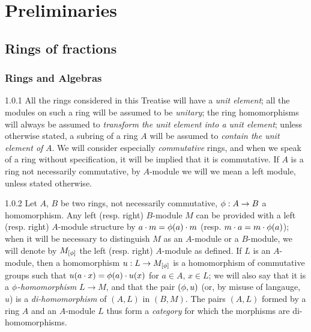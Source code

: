 \documentclass[10pt,oneside]{book}
\begin{document}
\clearpage

\setcounter{chapter}{-1}
\chapter{Preliminaries}
\label{0-prelim}

\section{Rings of fractions}
\label{0-prelim-1}

\setcounter{subsection}{-1}
\subsection{Rings and Algebras}
\label{0-prelim-1.0}

\begin{env}{1.0.1}
\label{env-0.1.0.1}
All the rings considered in this Treatise will have a \emph{unit element}; all the modules
on such a ring will be assumed to be \emph{unitary}; the ring homomorphisms will always be
assumed to \emph{transform the unit element into a unit element}; unless otherwise stated,
a subring of a ring $A$ will be assumed to \emph{contain the unit element of} $A$. We will
consider especially \emph{commutative} rings, and when we speak of a ring without
specification, it will be implied that it is commutative. If $A$ is a ring not necessarily
commutative, by $A$-module we will we mean a left module, unless stated otherwise.
\end{env}

\begin{env}{1.0.2}
\label{env-0.1.0.2}
Let $A$, $B$ be two rings, not necessarily commutative, $\phi:A\to B$ a homomorphism.
Any left (resp. right) $B$-module $M$ can be provided with a left (resp. right) $A$-module
structure by $a\cdot m=\phi(a)\cdot m$ (resp. $m\cdot a=m\cdot\phi(a)$); when it will
be necessary to distinguish $M$ as an $A$-module or a $B$-module, we will denote by
$M_{[\phi]}$ the left (resp. right) $A$-module as defined. If $L$ is an $A$-module, then
a homomorphism $u:L\to M_{[\phi]}$ is a homomorphism of commutative groups such that
$u(a\cdot x)=\phi(a)\cdot u(x)$ for $a\in A$, $x\in L$; we will also say that it is a
$\phi$-\emph{homomorphism} $L\to M$,
and that the pair $(\phi,u)$ (or, by misuse of langauge, $u$)
is a \emph{di-homomorphism} of $(A,L)$ in $(B,M)$. The pairs $(A,L)$ formed by a ring $A$
and an $A$-module $L$ thus form a \emph{category} for which the morphisms are
di-homomorphisms.
\end{env}
\end{document}
